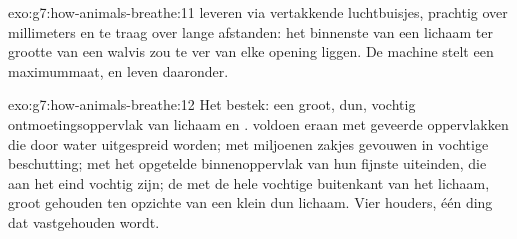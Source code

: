 \begin{solution}{exo:g7:how-animals-breathe:11}
 leveren via vertakkende luchtbuisjes, prachtig over
millimeters en te traag over lange afstanden: het binnenste van een
lichaam ter grootte van een walvis zou te ver van elke opening liggen. De
machine stelt een maximummaat, en  leven daaronder.
\end{solution}

\begin{solution}{exo:g7:how-animals-breathe:12}
Het bestek: een groot, dun, vochtig ontmoetingsoppervlak van lichaam en
.  voldoen eraan met geveerde oppervlakken die door water
uitgespreid worden;  met miljoenen zakjes gevouwen in vochtige
beschutting;  met het opgetelde binnenoppervlak van hun fijnste
uiteinden, die aan het eind vochtig zijn; de  met de hele vochtige
buitenkant van het lichaam, groot gehouden ten opzichte van een klein dun
lichaam. Vier houders, één ding dat vastgehouden wordt.
\end{solution}


